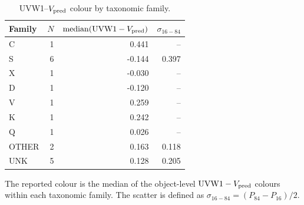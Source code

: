 \begin{table}[t]
\centering
\scriptsize
\caption{UVW1--$V_{\rm pred}$ colour by taxonomic family.}
\label{tab:taxonomy_colour_summary}
\begin{tabular}{lrrr}
\hline
Family & $N$ & $\mathrm{median}(\mathrm{UVW1}-V_{\rm pred})$ & $\sigma_{16-84}$ \\
\hline
C & 1 & 0.441 & -- \\
S & 6 & -0.144 & 0.397 \\
X & 1 & -0.030 & -- \\
D & 1 & -0.120 & -- \\
V & 1 & 0.259 & -- \\
K & 1 & 0.242 & -- \\
Q & 1 & 0.026 & -- \\
OTHER & 2 & 0.163 & 0.118 \\
UNK & 5 & 0.128 & 0.205 \\
\hline
\end{tabular}

\vspace{0.5ex}
\footnotesize
The reported colour is the median of the object-level $\mathrm{UVW1}-V_{\rm pred}$ colours within each taxonomic family. The scatter is defined as $\sigma_{16-84}=(P_{84}-P_{16})/2$.
\end{table}

